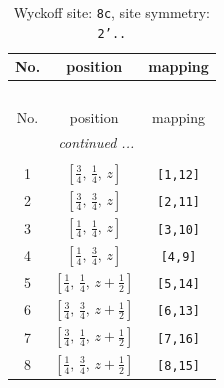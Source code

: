 \documentclass[fleqn,8pt]{jsarticle}
\begin{document}
\renewcommand{\arraystretch}{1.2}
\begin{longtable}{ccc}
\caption{Wyckoff site: {\tt 8c}, site symmetry: {\tt 2'..}}
 \\
 \hline \hline
No. & position & mapping \\ \hline \endfirsthead

\multicolumn{2}{l}{\tablename\ \thetable{}} \\
 \hline \hline
No. & position & mapping \\ \hline \endhead

 \hline \hline
\multicolumn{2}{r}{\footnotesize\it continued ...} \\ \endfoot

 \hline \hline
\multicolumn{2}{r}{} \\ \endlastfoot

1 & $\left[ \frac{3}{4},\, \frac{1}{4},\, z \right]$ & {\tt [1,12]} \\ \hline
2 & $\left[ \frac{3}{4},\, \frac{3}{4},\, z \right]$ & {\tt [2,11]} \\ \hline
3 & $\left[ \frac{1}{4},\, \frac{1}{4},\, z \right]$ & {\tt [3,10]} \\ \hline
4 & $\left[ \frac{1}{4},\, \frac{3}{4},\, z \right]$ & {\tt [4,9]} \\ \hline
5 & $\left[ \frac{1}{4},\, \frac{1}{4},\, z + \frac{1}{2} \right]$ & {\tt [5,14]} \\ \hline
6 & $\left[ \frac{3}{4},\, \frac{3}{4},\, z + \frac{1}{2} \right]$ & {\tt [6,13]} \\ \hline
7 & $\left[ \frac{3}{4},\, \frac{1}{4},\, z + \frac{1}{2} \right]$ & {\tt [7,16]} \\ \hline
8 & $\left[ \frac{1}{4},\, \frac{3}{4},\, z + \frac{1}{2} \right]$ & {\tt [8,15]} \\
\end{longtable}
\renewcommand{\arraystretch}{1.2}
\end{document}
